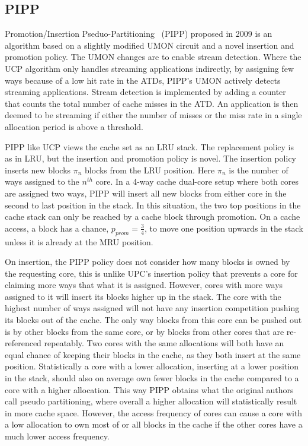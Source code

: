 
\subsection{PIPP}
\label{sec:algorithms:pipp}

Promotion/Insertion Pseduo-Partitioning~\cite{Xie2009} (PIPP) proposed in 2009 is an algorithm based on a slightly modified UMON circuit and a novel insertion and promotion policy.
The UMON changes are to enable stream detection.
Where the UCP algorithm only handles streaming applications indirectly, by assigning few ways because of a low hit rate in the ATDs, PIPP's UMON actively detects streaming applications.
Stream detection is implemented by adding a counter that counts the total number of cache misses in the ATD.
An application is then deemed to be streaming if either the number of misses or the miss rate in a single allocation period is above a threshold.

PIPP like UCP views the cache set as an LRU stack.
The replacement policy is as in LRU, but the insertion and promotion policy is novel.
The insertion policy inserts new blocks $\pi_n$ blocks from the LRU position. 
Here $\pi_n$ is the number of ways assigned to the $n^{th}$ core.
In a 4-way cache dual-core setup where both cores are assigned two ways, PIPP will insert all new blocks from either core in the second to last position in the stack. 
In this situation, the two top positions in the cache stack can only be reached by a cache block through promotion.
On a cache access, a block has a chance, $p_{prom} = \frac{3}{4}$, to move one position upwards in the stack unless it is already at the MRU position.

On insertion, the PIPP policy does not consider how many blocks is owned by the requesting core, this is unlike UPC's insertion policy that prevents a core for claiming more ways that what it is assigned.
However, cores with more ways assigned to it will insert its blocks higher up in the stack. 
The core with the highest number of ways assigned will not have any insertion competition pushing its blocks out of the cache.
The only way blocks from this core can be pushed out is by other blocks from the same core, or by blocks from other cores that are re-referenced repeatably.
Two cores with the same allocations will both have an equal chance of keeping their blocks in the cache, as they both insert at the same position.
Statistically a core with a lower allocation, inserting at a lower position in the stack, should also on average own fewer blocks in the cache compared to a core with a higher allocation.
This way PIPP obtains what the original authors call pseudo partitioning, where overall a higher allocation will statistically result in more cache space.
However, the access frequency of cores can cause a core with a low allocation to own most of or all blocks in the cache if the other cores have a much lower access frequency.

